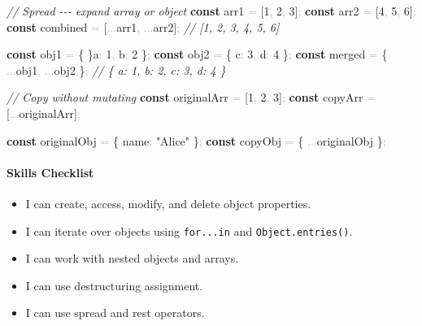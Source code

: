 \documentclass[
  justified,
  openright,
]{tufte-book}
\let\subsection\paragraph
\let\paragraph\paragraph
\newcommand{\KeywordTok}[1]{\textcolor{CodeKeyword}{\textbf{#1}}}  %
\newcommand{\StringTok}[1]{\textcolor{CodeString}{#1}}              %
\newcommand{\CommentTok}[1]{\textcolor{CodeComment}{\textit{#1}}}  %
\newcommand{\CodeNumTok}[1]{\textcolor{CodeNumber}{#1}}             %
\newcommand{\CodeTypeTok}[1]{\textcolor{CodeType}{#1}}              %
\newcommand{\OperatorTok}[1]{\textcolor{DarkGray}{#1}}              %
\newenvironment{Shaded}{%
  \begin{mdframed}[style=TufteCode]%
}{%
  \end{mdframed}%
}
\let\subsection\paragraph
\let\paragraph\paragraph
\providecommand{\tightlist}{%
  \setlength{\itemsep}{0pt}\setlength{\parskip}{0pt}}
\begin{document}
\begin{Shaded}
\begin{Highlighting}[]
\CommentTok{// Spread {-}{-}{-} expand array or object}
\KeywordTok{const} arr1 \OperatorTok{=} [\CodeNumTok{1}\OperatorTok{,} \CodeNumTok{2}\OperatorTok{,} \CodeNumTok{3}]\OperatorTok{;}
\KeywordTok{const} arr2 \OperatorTok{=} [\CodeNumTok{4}\OperatorTok{,} \CodeNumTok{5}\OperatorTok{,} \CodeNumTok{6}]\OperatorTok{;}
\KeywordTok{const} combined \OperatorTok{=} [\OperatorTok{...}arr1\OperatorTok{,} \OperatorTok{...}arr2]\OperatorTok{;} \CommentTok{// [1, 2, 3, 4, 5, 6]}
 
\KeywordTok{const} obj1 \OperatorTok{=} \{ \}\CodeTypeTok{a}\OperatorTok{:} \CodeNumTok{1}\OperatorTok{,} \CodeTypeTok{b}\OperatorTok{:} \CodeNumTok{2} \}\OperatorTok{;}
\KeywordTok{const} obj2 \OperatorTok{=} \{ \CodeTypeTok{c}\OperatorTok{:} \CodeNumTok{3}\OperatorTok{,} \CodeTypeTok{d}\OperatorTok{:} \CodeNumTok{4} \}\OperatorTok{;}
\KeywordTok{const} merged \OperatorTok{=} \{ \OperatorTok{...}obj1\OperatorTok{,} \OperatorTok{...}obj2 \}\OperatorTok{;} \CommentTok{// \{ a: 1, b: 2, c: 3, d: 4 \}}
 
\CommentTok{// Copy without mutating}
\KeywordTok{const} originalArr \OperatorTok{=} [\CodeNumTok{1}\OperatorTok{,} \CodeNumTok{2}\OperatorTok{,} \CodeNumTok{3}]\OperatorTok{;}
\KeywordTok{const} copyArr \OperatorTok{=} [\OperatorTok{...}originalArr]\OperatorTok{;}
 
\KeywordTok{const} originalObj \OperatorTok{=} \{ \CodeTypeTok{name}\OperatorTok{:} \StringTok{"Alice"} \}\OperatorTok{;}
\KeywordTok{const} copyObj \OperatorTok{=} \{ \OperatorTok{...}originalObj \}\OperatorTok{;}
\end{Highlighting}
\end{Shaded}

\subsection{Skills Checklist}\label{skills-checklist-61}

\begin{itemize}
\tightlist
\item[$\square$]
  I can create, access, modify, and delete object properties.
\item[$\square$]
  I can iterate over objects using \texttt{for...in} and
  \texttt{Object.entries()}.
\item[$\square$]
  I can work with nested objects and arrays.
\item[$\square$]
  I can use destructuring assignment.
\item[$\square$]
  I can use spread and rest operators.
\end{itemize}
\end{document}
